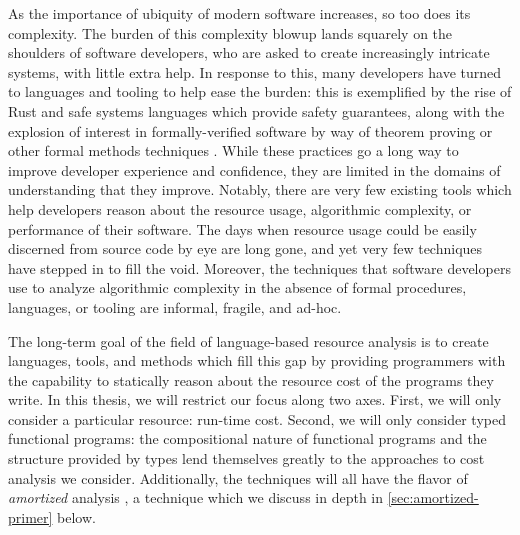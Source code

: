 

As the importance of ubiquity of modern software increases, so too does its complexity. The burden of this complexity blowup lands squarely on the shoulders of software developers, who are asked to create increasingly intricate systems, with little extra help. In response to this, many developers have turned to languages and tooling to help ease the burden: this is exemplified by the rise of Rust and safe systems languages \citehere which provide safety guarantees, along with the explosion of interest in formally-verified software by way of theorem proving or other formal methods techniques \cite{ringer-et-al:qed}. While these practices go a long way to improve developer experience and confidence, they are limited in the domains of understanding that they improve. Notably, there are very few existing tools which help developers reason about the resource usage, algorithmic complexity, or performance of their software. The days when resource usage could be easily discerned from source code by eye are long gone, and yet very few techniques have stepped in to fill the void. Moreover, the techniques that software developers use to analyze algorithmic complexity in the absence of formal procedures, languages, or tooling are informal, fragile, and ad-hoc.

The long-term goal of the field of language-based resource analysis is to create languages, tools, and methods which fill this gap by providing programmers with the capability to statically reason about the resource cost of the programs they write. In this thesis, we will restrict our focus along two axes. First, we will only consider a particular resource: run-time cost.
Second, we will only consider typed functional programs: the compositional nature of functional programs and the structure provided by types lend themselves greatly to the approaches to cost analysis we consider. Additionally, the techniques will all have the flavor of \textit{amortized} analysis \cite{tarjan:amortized-complexity}, a technique which we discuss in depth in \autoref{sec:amortized-primer} below.


